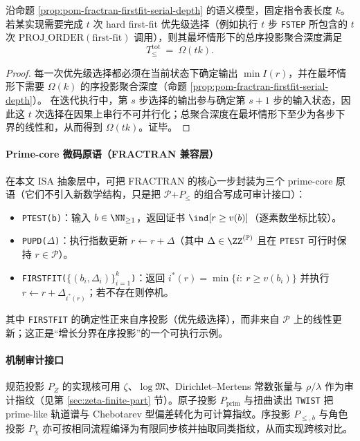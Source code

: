 \begin{corollary}[迭代执行的总序投影聚合深度线性下界]\label{cor:pom-fractran-firstfit-total-serial-depth}
沿命题 \ref{prop:pom-fractran-firstfit-serial-depth} 的语义模型，固定指令表长度 \(k\)。
若某实现需要完成 \(t\) 次 hard first-fit 优先级选择（例如执行 \(t\) 步 \texttt{FSTEP} 所包含的 \(t\) 次 \(\mathrm{PROJ\_ORDER}(\text{first-fit})\) 调用），则其最坏情形下的总序投影聚合深度满足
\[
T_{\le}^{\mathrm{tot}}\ =\ \Omega(tk).
\]
\end{corollary}
\begin{proof}
每一次优先级选择都必须在当前状态下确定输出 \(\min I(r)\)，并在最坏情形下需要 \(\Omega(k)\) 的序投影聚合深度（命题 \ref{prop:pom-fractran-firstfit-serial-depth}）。
在迭代执行中，第 \(s\) 步选择的输出参与确定第 \(s+1\) 步的输入状态，因此这 \(t\) 次选择在因果上串行不可并行化；总聚合深度在最坏情形下至少为各步下界的线性和，从而得到 \(\Omega(tk)\)。证毕。
\end{proof}

\paragraph{Prime-core 微码原语（FRACTRAN 兼容层）}
在本文 ISA 抽象层中，可把 FRACTRAN 的核心一步封装为三个 prime-core 原语（它们不引入新数学结构，只是把 \(\mathcal{P}\)+\(P_{\le}\) 的组合写成可审计接口）：
\begin{itemize}
  \item \texttt{PTEST(b)}：输入 \(b\in\NN_{\ge 1}\)，返回证书 \(\ind\!\left[r\ge v(b)\right]\)（逐素数坐标比较）。
  \item \texttt{PUPD($\Delta$)}：执行指数更新 \(r\leftarrow r+\Delta\)（其中 \(\Delta\in\ZZ^{(\mathbb{P})}\) 且在 \texttt{PTEST} 可行时保持 \(r\in\mathcal{P}\)）。
  \item \texttt{FIRSTFIT($\{(b_i,\Delta_i)\}_{i=1}^k$)}：返回 \(i^\ast(r)=\min\{i:\ r\ge v(b_i)\}\) 并执行 \(r\leftarrow r+\Delta_{i^\ast(r)}\)；若不存在则停机。
\end{itemize}
其中 \texttt{FIRSTFIT} 的确定性正来自序投影（优先级选择），而非来自 \(\mathcal{P}\) 上的线性更新；这正是“增长分界在序投影”的一个可执行示例。

\paragraph{机制审计接口}
规范投影 $P_Z$ 的实现核可用 $\zeta$、$\log\mathfrak{M}$、Dirichlet--Mertens 常数张量与 $\rho/\lambda$ 作为审计指纹（见第 \ref{sec:zeta-finite-part} 节）。原子投影 $P_{\mathrm{prim}}$ 与扭曲读出 \texttt{TWIST} 把 prime-like 轨道谱与 Chebotarev 型偏差转化为可计算指纹。序投影 $P_{\le,b}$ 与角色投影 $P_\chi$ 亦可按相同流程编译为有限同步核并抽取同类指纹，从而实现跨核对比。

